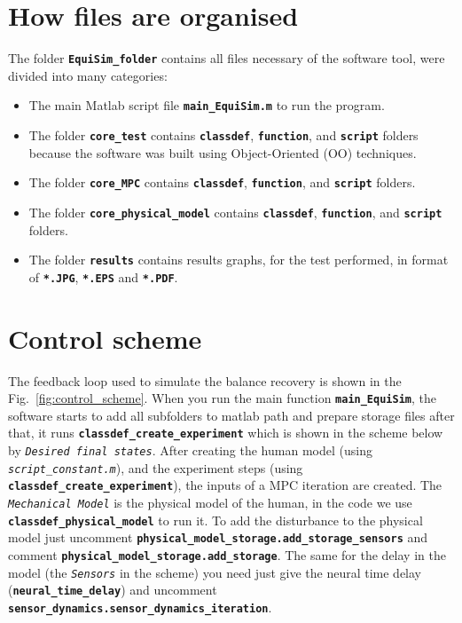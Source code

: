 \documentclass[12pt,oneside,notitlepage,abstracton,a4paper]{scrartcl}
\begin{document}
\section{How files are organised} \label{How}
The folder \textbf{\texttt{EquiSim\_folder}} contains all files necessary of the software tool, were divided into many categories: 
\begin{itemize}
	  \item  The main Matlab script file \textbf{\texttt{main\_EquiSim.m}} to run the program. 
	  \item  The folder \textbf{\texttt{core\_test}} contains \textbf{\texttt{classdef}}, \textbf{\texttt{function}}, and \textbf{\texttt{script}} folders because the software was built using Object-Oriented (OO) techniques. 
	  \item  The folder \textbf{\texttt{core\_MPC}} contains \textbf{\texttt{classdef}}, \textbf{\texttt{function}}, and \textbf{\texttt{script}} folders. 
	  \item  The folder \textbf{\texttt{core\_physical\_model}} contains \textbf{\texttt{classdef}}, \textbf{\texttt{function}}, and \textbf{\texttt{script}} folders. 
	  \item  The folder \textbf{\texttt{results}} contains results graphs, for the test performed, in format of  \textbf{\texttt{*.JPG}}, \textbf{\texttt{*.EPS}} and \textbf{\texttt{*.PDF}}. 
\end{itemize}

\nopagebreak
\pagebreak 
\section{Control scheme}
 The feedback loop used to simulate the balance recovery is shown in the Fig.~\ref{fig:control_scheme}. When you run the main function \textbf{\texttt{main\_EquiSim}}, the software starts to add all subfolders to matlab path and prepare storage files after that, it runs \textbf{\texttt{classdef\_create\_experiment}} which is shown in the scheme below by \textit{\texttt{Desired final states}}. After creating the human model (using \textit{\texttt{script\_constant.m}}), and the experiment steps (using \textbf{\texttt{classdef\_create\_experiment}}), the inputs of a MPC iteration are created. The \textit{\texttt{Mechanical Model}} is the physical model of the human, in the code we use \textbf{\texttt{classdef\_physical\_model}} to run it. To add the disturbance to the physical model just uncomment \textbf{\texttt{physical\_model\_storage.add\_storage\_sensors}}  and comment \textbf{\texttt{physical\_model\_storage.add\_storage}}. The same for the delay in the model (the \textit{\texttt{Sensors}} in the scheme) you need just give the neural time delay (\textbf{\texttt{neural\_time\_delay}}) and uncomment \textbf{\texttt{sensor\_dynamics.sensor\_dynamics\_iteration}}.        
\end{document}
